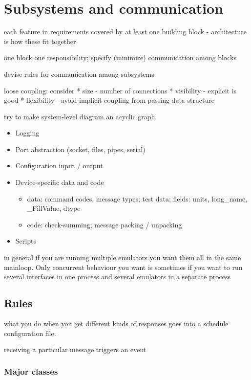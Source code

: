 \documentclass[pdftex,oneside,12pt,a4paper]{book}
\begin{document}
\section{Subsystems and communication}
each feature in requirements covered by at least one building block - architecture is how these fit together

one block one responsibility; specify (minimize) communication among blocks

devise rules for communication among subsystems

loose coupling:  consider
 * size - number of connections
 * visibility - explicit is good
 * flexibility - avoid implicit coupling from passing data structure

try to make system-level diagram an acyclic graph    

\begin{itemize}
\item Logging
\item Port abstraction (socket, files, pipes, serial)
\item Configuration input / output
\item Device-specific data and code
  \begin{itemize}
  \item data: command codes, message types; test data; fields: units, long\_name, \_FillValue, dtype
  \item code: check-summing; message packing / unpacking
  \end{itemize}
\item Scripts
\end{itemize}

in general if you are running multiple emulators you want them all in the same mainloop.  Only concurrent behaviour you want is sometimes if you want to run several interfaces in one process and several emulators in a separate process

\subsection{Rules}
what you do when you get different kinds of responses goes into a schedule configuration file.

receiving a particular message triggers an event

\subsubsection{Major classes}
\end{document}
